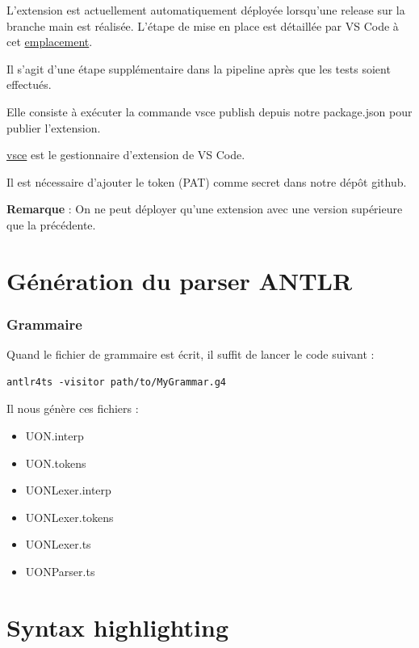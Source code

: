 \documentclass[
    iict, %
    il, %
]{heig-tb}
\begin{document}
L'extension est actuellement automatiquement déployée lorsqu'une release sur la branche main est réalisée.
L'étape de mise en place est détaillée par VS Code à cet \href{https://code.visualstudio.com/api/working-with-extensions/continuous-integration#github-actions}{emplacement}.

Il s'agit d'une étape supplémentaire dans la pipeline après que les tests soient effectués.

Elle consiste à exécuter la commande vsce publish depuis notre package.json pour publier l'extension.

\href{https://www.npmjs.com/package/vsce}{vsce} est le gestionnaire d'extension de VS Code.

Il est nécessaire d'ajouter le token (PAT) comme secret dans notre dépôt github. %

\textbf{Remarque } : On ne peut déployer qu'une extension avec une version supérieure que la précédente. %




\section{Génération du parser ANTLR}
\subsubsection{Grammaire}

Quand le fichier de grammaire est écrit, il suffit de lancer le code suivant :

\begin{lstlisting}[frame=single]
    antlr4ts -visitor path/to/MyGrammar.g4
\end{lstlisting}

Il nous génère ces fichiers :
\begin{itemize}
    \item UON.interp
    \item UON.tokens
    \item UONLexer.interp
    \item UONLexer.tokens
    \item UONLexer.ts
    \item UONParser.ts
\end{itemize}

\section{Syntax highlighting}
\end{document}
